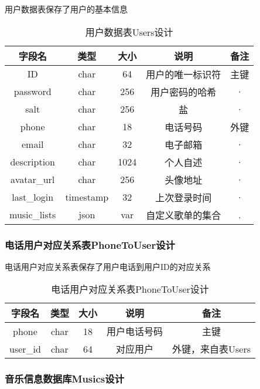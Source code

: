 用户数据表保存了用户的基本信息

\begin{table}[htbp]
\centering
\caption{用户数据表Users设计} \label{tab:users-database}
\begin{tabular}{|c|c|c|c|c|}
    \hline
    字段名 & 类型 & 大小 & 说明 & 备注 \\
    \hline
    ID & char & 64 & 用户的唯一标识符 & 主键\\
    \hline
    password & char & 256 & 用户密码的哈希 & · \\
    \hline
    salt & char & 256 & 盐 & · \\
    \hline
    phone & char & 18 & 电话号码 & 外键 \\
    \hline
    email & char & 32 & 电子邮箱 & · \\
    \hline
    description & char & 1024 & 个人自述 & · \\
    \hline
    avatar\_url & char & 256 & 头像地址 & · \\
    \hline
    last\_login & timestamp & 32 & 上次登录时间 & · \\
    \hline
    music\_lists & json & var & 自定义歌单的集合 & . \\
    \hline
\end{tabular}
\end{table}

\subsubsection{电话用户对应关系表PhoneToUser设计}

电话用户对应关系表保存了用户电话到用户ID的对应关系

\begin{table}[htbp]
\centering
\caption{电话用户对应关系表PhoneToUser设计} \label{tab:phone-user-database}
\begin{tabular}{|c|c|c|c|c|}
    \hline
    字段名 & 类型 & 大小 & 说明 & 备注 \\
    \hline
    phone & char & 18 & 用户电话号码 & 主键\\
    \hline
    user\_id & char & 64 & 对应用户 & 外键，来自表Users \\
    \hline
\end{tabular}
\end{table}

\subsubsection{音乐信息数据库Musics设计}

